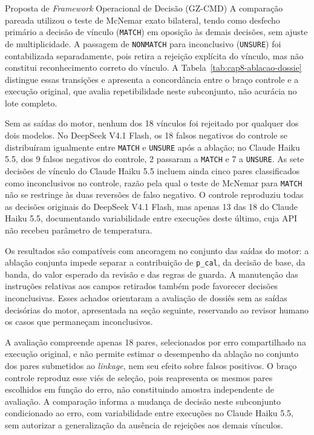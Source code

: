 \begin{chapter}{Proposta de \textit{Framework} Operacional de Decisão (GZ-CMD)}
A comparação pareada utilizou o teste de McNemar exato bilateral, tendo como desfecho primário a decisão de vínculo (\texttt{MATCH}) em oposição às demais decisões, sem ajuste de multiplicidade. A passagem de \texttt{NONMATCH} para inconclusivo (\texttt{UNSURE}) foi contabilizada separadamente, pois retira a rejeição explícita do vínculo, mas não constitui reconhecimento correto do vínculo. A Tabela~\ref{tab:cap8-ablacao-dossie} distingue essas transições e apresenta a concordância entre o braço controle e a execução original, que avalia repetibilidade neste subconjunto, não acurácia no lote completo.



Sem as saídas do motor, nenhum dos 18 vínculos foi rejeitado por qualquer dos dois modelos. No DeepSeek V4.1 Flash, os 18 falsos negativos do controle se distribuíram igualmente entre \texttt{MATCH} e \texttt{UNSURE} após a ablação; no Claude Haiku 5.5, dos 9 falsos negativos do controle, 2 passaram a \texttt{MATCH} e 7 a \texttt{UNSURE}. As sete decisões de vínculo do Claude Haiku 5.5 incluem ainda cinco pares classificados como inconclusivos no controle, razão pela qual o teste de McNemar para \texttt{MATCH} não se restringe às duas reversões de falso negativo. O controle reproduziu todas as decisões originais do DeepSeek V4.1 Flash, mas apenas 13 das 18 do Claude Haiku 5.5, documentando variabilidade entre execuções deste último, cuja API não recebeu parâmetro de temperatura.

Os resultados são compatíveis com ancoragem no conjunto das saídas do motor: a ablação conjunta impede separar a contribuição de \texttt{p\_cal}, da decisão de base, da banda, do valor esperado da revisão e das regras de guarda. A manutenção das instruções relativas aos campos retirados também pode favorecer decisões inconclusivas. Esses achados orientaram a avaliação de dossiês sem as saídas decisórias do motor, apresentada na seção seguinte, reservando ao revisor humano os casos que permaneçam inconclusivos.

A avaliação compreende apenas 18 pares, selecionados por erro compartilhado na execução original, e não permite estimar o desempenho da ablação no conjunto dos pares submetidos ao \textit{linkage}, nem seu efeito sobre falsos positivos. O braço controle reproduz esse viés de seleção, pois reapresenta os mesmos pares escolhidos em função do erro, não constituindo amostra independente de avaliação. A comparação informa a mudança de decisão neste subconjunto condicionado ao erro, com variabilidade entre execuções no Claude Haiku 5.5, sem autorizar a generalização da ausência de rejeições aos demais vínculos.


\end{chapter}
